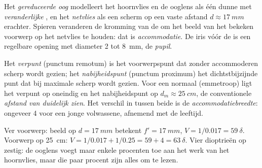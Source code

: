 \begin{definition}\label{def:b1:optical-instruments:eye}
Het \emph{gereduceerde oog} modelleert het hoornvlies en de ooglens als één
dunne  met \emph{veranderlijke} , en het
\emph{netvlies} als een scherm op een vaste afstand $d \approx \qty{17}{mm}$
erachter. Spieren veranderen de kromming van de  om het beeld van het
bekeken voorwerp op het netvlies te houden: dat is \emph{accommodatie}. De
iris vóór de  is een regelbare opening met diameter \qty{2}{} tot
\qty{8}{mm}, de \emph{pupil}.
\end{definition}

\begin{definition}\label{def:b1:optical-instruments:punctum}
Het \emph{verpunt} (punctum remotum) is het voorwerpspunt dat zonder
accommoderen scherp wordt gezien; het \emph{nabijheidspunt} (punctum proximum)
het dichtstbijzijnde punt dat bij maximale  scherp wordt gezien.
Voor een normaal (emmetroop)  ligt het verpunt op oneindig en het
nabijheidspunt op $d_m \approx \qty{25}{cm}$, de conventionele
\emph{afstand van duidelijk zien}. Het verschil in  tussen beide is de
\emph{accommodatiebreedte}: ongeveer \qty{4}{\delta} voor een jonge
volwassene, afnemend met de leeftijd.
\end{definition}

\begin{example}\label{ex:b1:optical-instruments:vergence}
Ver voorwerp: beeld op $d = \qty{17}{mm}$ betekent $f' = \qty{17}{mm}$,
$V = 1/0.017 = \qty{59}{\delta}$. Voorwerp op \qty{25}{cm}:
$V = 1/0.017 + 1/0.25 = 59 + 4 = \qty{63}{\delta}$. Vier dioptrieën
 op zestig: de ooglens voegt maar enkele procenten toe aan het
werk van het hoornvlies, maar die paar procent zijn alles om te lezen.
\end{example}

